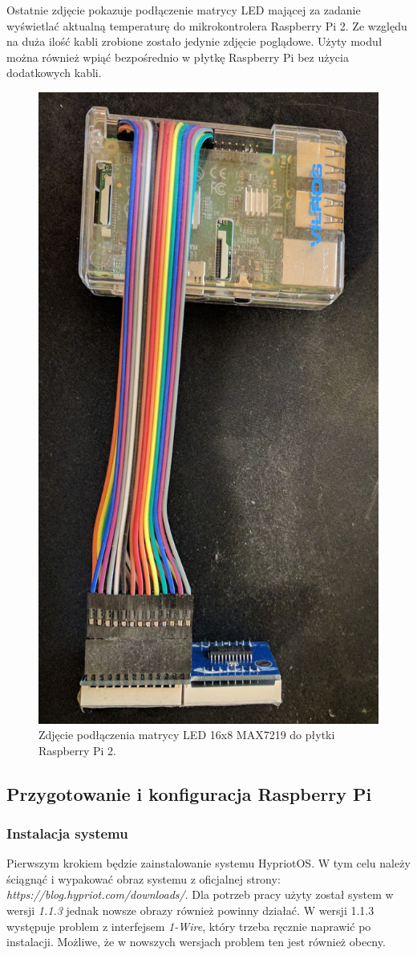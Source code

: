 \documentclass[12pt]{report}
\let\Oldsubsection\subsection
\renewcommand{\subsection}{\FloatBarrier\Oldsubsection}
\let\Oldsubsubsection\subsubsection
\renewcommand{\subsubsection}{\FloatBarrier\Oldsubsubsection}
\begin{document}
{Ostatnie zdjęcie pokazuje podłączenie matrycy LED mającej za zadanie wyświetlać aktualną temperaturę do mikrokontrolera Raspberry Pi 2. Ze względu na duża ilość kabli zrobione zostało jedynie zdjęcie poglądowe. Użyty moduł można również wpiąć bezpośrednio w płytkę Raspberry Pi bez użycia dodatkowych kabli. 

\begin{figure}[h]
	\centering
	\includegraphics[height=1\textwidth]{images/rpi-node.jpg}
	\caption{Zdjęcie podłączenia matrycy LED 16x8 MAX7219 do płytki Raspberry Pi 2.}
\end{figure}
\FloatBarrier	
\subsection{Przygotowanie i konfiguracja Raspberry Pi}
\subsubsection{Instalacja systemu}
Pierwszym krokiem będzie zainstalowanie systemu HypriotOS. W tym celu należy ściągnąć i wypakować obraz systemu z oficjalnej strony: \textit{https://blog.hypriot.com/downloads/}. Dla potrzeb pracy użyty został system w wersji \textit{1.1.3} jednak nowsze obrazy również powinny działać. W wersji 1.1.3 występuje problem z interfejsem \textit{1-Wire}, który trzeba ręcznie naprawić po instalacji. Możliwe, że w nowszych wersjach problem ten jest również obecny.

}
\end{document}
